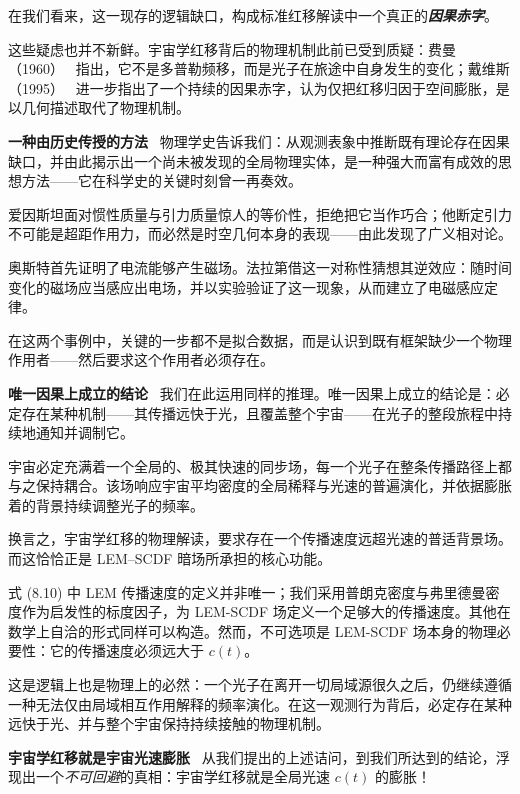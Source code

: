 \documentclass[12pt,leqno]{article}
\begin{document}
	\smallskip
	在我们看来，这一现存的逻辑缺口，构成标准红移解读中一个真正的\textbf{\textit{因果赤字}}。
	
	\medskip
	这些疑虑也并不新鲜。宇宙学红移背后的物理机制此前已受到质疑：费曼（1960）~\cite{Feynman:2011} 指出，它不是多普勒频移，而是光子在旅途中自身发生的变化；戴维斯（1995）~\cite{Davies:1995} 进一步指出了一个持续的因果赤字，认为仅把红移归因于空间膨胀，是以几何描述取代了物理机制。 
	
	\medskip
	\bigskip
	\textbf{一种由历史传授的方法}\,\,\,
	物理学史告诉我们：从观测表象中推断既有理论存在因果缺口，并由此揭示出一个尚未被发现的全局物理实体，是一种强大而富有成效的思想方法——它在科学史的关键时刻曾一再奏效。
	
	\medskip
	爱因斯坦面对惯性质量与引力质量惊人的等价性，拒绝把它当作巧合；他断定引力不可能是超距作用力，而必然是时空几何本身的表现——由此发现了广义相对论。 
	
	\medskip
	奥斯特首先证明了电流能够产生磁场。法拉第借这一对称性猜想其逆效应：随时间变化的磁场应当感应出电场，并以实验验证了这一现象，从而建立了电磁感应定律。
	
	\medskip
	在这两个事例中，关键的一步都不是拟合数据，而是认识到既有框架缺少一个物理作用者——然后要求这个作用者必须存在。
	
	
	
	\medskip
	\bigskip
	\textbf{唯一因果上成立的结论}\,\,\,
	我们在此运用同样的推理。唯一因果上成立的结论是：必定存在某种机制——其传播远快于光，且覆盖整个宇宙——在光子的整段旅程中持续地通知并调制它。 
	
	\medskip
	宇宙必定充满着一个全局的、极其快速的同步场，每一个光子在整条传播路径上都与之保持耦合。该场响应宇宙平均密度的全局稀释与光速的普遍演化，并依据膨胀着的背景持续调整光子的频率。
	
	\medskip
	换言之，宇宙学红移的物理解读，要求存在一个传播速度远超光速的普适背景场。而这恰恰正是 LEM--SCDF 暗场所承担的核心功能。
	
	\medskip
	式 (8.10) 中 LEM 传播速度的定义并非唯一；我们采用普朗克密度与弗里德曼密度作为启发性的标度因子，为 LEM-SCDF 场定义一个足够大的传播速度。其他在数学上自洽的形式同样可以构造。然而，不可选项是 LEM-SCDF 场本身的物理必要性：它的传播速度必须远大于 $c(t)$。
	
	\medskip
	这是逻辑上也是物理上的必然：一个光子在离开一切局域源很久之后，仍继续遵循一种无法仅由局域相互作用解释的频率演化。在这一观测行为背后，必定存在某种远快于光、并与整个宇宙保持持续接触的物理机制。
	
	
	\medskip
	\bigskip
	\textbf{宇宙学红移就是宇宙光速膨胀}\,\,\,
	从我们提出的上述诘问，到我们所达到的结论，浮现出一个\emph{不可回避}的真相：宇宙学红移就是全局光速 $c(t)$ 的膨胀！
	
\end{document}
